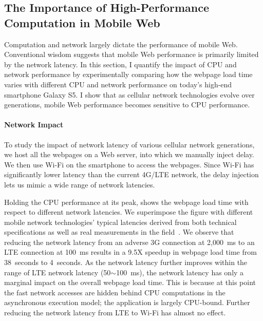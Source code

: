 \subsection{The Importance of High-Performance Computation in Mobile Web}
\label{sec:motivation:perf}

Computation and network largely dictate the performance of mobile Web. Conventional wisdom suggests that mobile Web performance is primarily limited by the network latency. In this section, I quantify the impact of CPU and network performance by experimentally comparing how the webpage load time varies with different CPU and network performance on today's high-end smartphone Galaxy S5. I show that as cellular network technologies evolve over generations, mobile Web performance becomes sensitive to CPU performance.


\paragraph{Network Impact} To study the impact of network latency of various cellular network generations, we host all the webpages on a Web server, into which we manually inject delay. We then use Wi-Fi on the smartphone to access the webpages. Since Wi-Fi has significantly lower latency than the current 4G/LTE network, the delay injection lets us mimic a wide range of network latencies. 

Holding the CPU performance at its peak,  shows the webpage load time with respect to different network latencies. We superimpose the figure with different mobile network technologies' typical latencies derived from both technical specifications as well as real measurements in the field~\cite{HPBN, carrier_measure}. We observe that reducing the network latency from an adverse 3G connection at 2,000~ms to an LTE connection at 100~ms results in a 9.5X speedup in webpage load time from 38~seconds to 4~seconds. As the network latency further improves within the range of LTE network latency (50$\sim$100~ms), the network latency has only a marginal impact on the overall webpage load time. This is because at this point the fast network accesses are hidden behind CPU computations in the asynchronous execution model; the application is largely CPU-bound. Further reducing the network latency from LTE to Wi-Fi has almost no effect.

